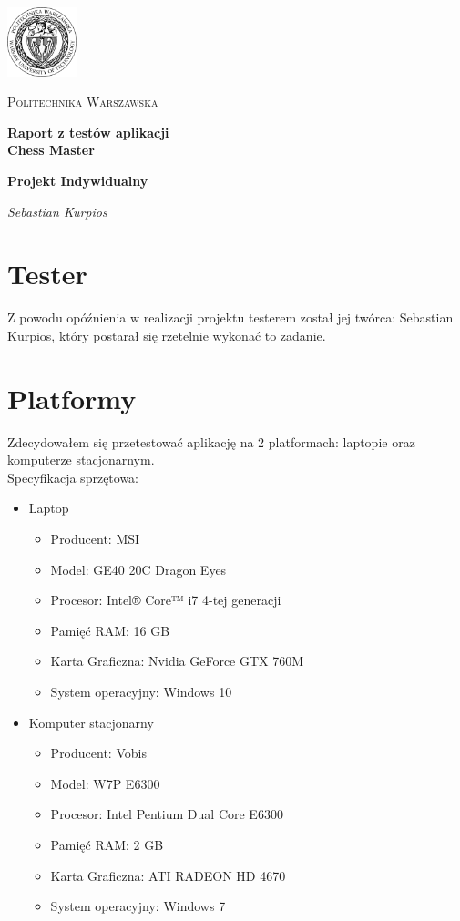 \documentclass[12pt]{article}
\begin{document}
\begin{titlepage}
\centering
\includegraphics[width=0.15\textwidth]{logo}\par\vspace{1cm}
{\scshape\LARGE Politechnika Warszawska \par}
\vspace{1cm}
{\huge\bfseries  Raport z testów aplikacji \\ Chess Master \linebreak \\  \par}
\vspace{1cm}
{\bfseries Projekt Indywidualny \par}
\vspace{2cm}
{\Large\itshape  Sebastian Kurpios \par}
\end{titlepage}

\tableofcontents
\newpage

\section{Tester}
Z powodu opóźnienia w realizacji projektu testerem został jej twórca: Sebastian Kurpios, który postarał się rzetelnie wykonać to zadanie.

\section{Platformy}
Zdecydowałem się przetestować aplikację na 2 platformach: laptopie oraz komputerze stacjonarnym. \\
Specyfikacja sprzętowa:
\begin{itemize}
\item Laptop
\begin{itemize}
\item Producent: MSI
\item Model: GE40 20C Dragon Eyes
\item Procesor: Intel® Core™ i7 4-tej generacji
\item Pamięć RAM: 16 GB
\item Karta Graficzna: Nvidia GeForce GTX 760M 
\item System operacyjny: Windows 10
\end{itemize}
\item Komputer stacjonarny
\begin{itemize}
\item Producent: Vobis
\item Model: W7P E6300
\item Procesor:  Intel Pentium Dual Core E6300
\item Pamięć RAM: 2 GB
\item Karta Graficzna: ATI RADEON HD 4670
\item System operacyjny: Windows 7
\end{itemize}
\end{itemize} 
\newpage
\end{document}
